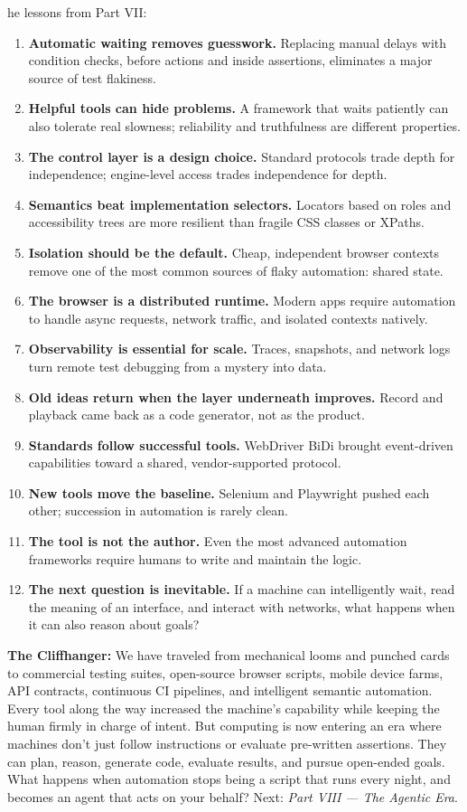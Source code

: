 \documentclass[11pt, a4paper, openany]{book}
\newcommand{\initialcap}[1]{{\fontfamily{lmss}\selectfont\huge\textbf{#1}}}
\begin{document}
\noindent \initialcap{T}he lessons from Part VII:
\begin{enumerate}
    \item \textbf{Automatic waiting removes guesswork.} Replacing manual delays with condition checks, before actions and inside assertions, eliminates a major source of test flakiness.
    \item \textbf{Helpful tools can hide problems.} A framework that waits patiently can also tolerate real slowness; reliability and truthfulness are different properties.
    \item \textbf{The control layer is a design choice.} Standard protocols trade depth for independence; engine-level access trades independence for depth.
    \item \textbf{Semantics beat implementation selectors.} Locators based on roles and accessibility trees are more resilient than fragile CSS classes or XPaths.
    \item \textbf{Isolation should be the default.} Cheap, independent browser contexts remove one of the most common sources of flaky automation: shared state.
    \item \textbf{The browser is a distributed runtime.} Modern apps require automation to handle async requests, network traffic, and isolated contexts natively.
    \item \textbf{Observability is essential for scale.} Traces, snapshots, and network logs turn remote test debugging from a mystery into data.
    \item \textbf{Old ideas return when the layer underneath improves.} Record and playback came back as a code generator, not as the product.
    \item \textbf{Standards follow successful tools.} WebDriver BiDi brought event-driven capabilities toward a shared, vendor-supported protocol.
    \item \textbf{New tools move the baseline.} Selenium and Playwright pushed each other; succession in automation is rarely clean.
    \item \textbf{The tool is not the author.} Even the most advanced automation frameworks require humans to write and maintain the logic.
    \item \textbf{The next question is inevitable.} If a machine can intelligently wait, read the meaning of an interface, and interact with networks, what happens when it can also reason about goals?
\end{enumerate}

\noindent \textbf{The Cliffhanger:} We have traveled from mechanical looms and punched cards to commercial testing suites, open-source browser scripts, mobile device farms, API contracts, continuous CI pipelines, and intelligent semantic automation. Every tool along the way increased the machine's capability while keeping the human firmly in charge of intent. But computing is now entering an era where machines don't just follow instructions or evaluate pre-written assertions. They can plan, reason, generate code, evaluate results, and pursue open-ended goals. What happens when automation stops being a script that runs every night, and becomes an agent that acts on your behalf? Next: \textit{Part VIII --- The Agentic Era}.
\end{document}
